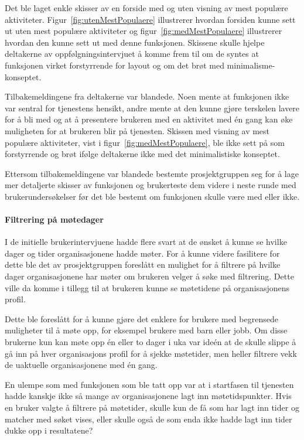 Det ble laget enkle skisser av en forside med og uten visning av mest populære aktiviteter. Figur~\ref{fig:utenMestPopulaere} illustrerer hvordan forsiden kunne sett ut uten mest populære aktiviteter og figur~\ref{fig:medMestPopulaere} illustrerer hvordan den kunne sett ut med denne funksjonen. Skissene skulle hjelpe deltakerne av oppfølgningsintervjuet å komme frem til om de syntes at funksjonen virket forstyrrende for layout og om det brøt med minimalisme-konseptet.

Tilbakemeldingene fra deltakerne var blandede. Noen mente at funksjonen ikke var sentral for tjenestens hensikt, andre mente at den kunne gjøre terskelen lavere for å bli med og at å presentere brukeren med en aktivitet med én gang kan øke muligheten for at brukeren blir på tjenesten. Skissen med visning av mest populære aktiviteter, vist i figur~\ref{fig:medMestPopulaere}, ble ikke sett på som forstyrrende og brøt ifølge deltakerne ikke med det minimalistiske konseptet. 

Ettersom tilbakemeldingene var blandede bestemte prosjektgruppen seg for å lage mer detaljerte skisser av funksjonen og brukerteste dem videre i neste runde med brukerundersøkelser før det ble bestemt om funksjonen skulle være med eller ikke.

\paragraph{Filtrering på møtedager}
I de initielle brukerintervjuene hadde flere svart at de ønsket å kunne se hvilke dager og tider organisasjonene hadde møter. For å kunne videre fasilitere for dette ble det av prosjektgruppen foreslått en mulighet for å filtrere på hvilke dager organisasjonene har møter om brukeren velger å søke med filtrering. Dette ville da komme i tillegg til at brukeren kunne se møtetidene på organisasjonens profil. 

Dette ble foreslått for å kunne gjøre det enklere for brukere med begrensede muligheter til å møte opp, for eksempel brukere med barn eller jobb. Om disse brukerne kun kan møte opp én eller to dager i uka var ideén at de skulle slippe å gå inn på hver organisasjons profil for å sjekke møtetider, men heller filtrere vekk de uaktuelle organisasjonene med én gang.

En ulempe som med funksjonen som ble tatt opp var at i startfasen til tjenesten hadde kanskje ikke så mange av organisasjonene lagt inn møtetidspunkter. Hvis en bruker valgte å filtrere på møtetider, skulle kun de få som har lagt inn tider og matcher med søket vises, eller skulle også de som enda ikke hadde lagt inn tider dukke opp i resultatene?

